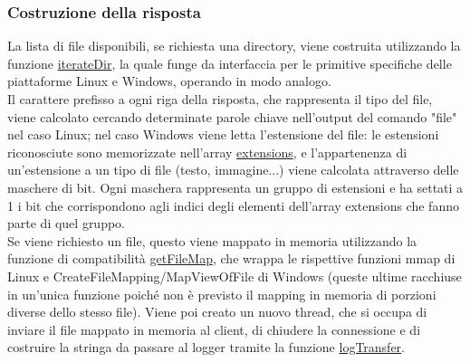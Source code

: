 \documentclass{article}
\begin{document}
\subsubsection{Costruzione della risposta}
La lista di file disponibili, se richiesta una directory, viene costruita utilizzando la funzione \href{html/platform_8h.html#a0cec7649e32d72daadab4beb95e6ef96}
{iterateDir}, la quale funge da interfaccia per le primitive specifiche delle piattaforme Linux e Windows,
operando in modo analogo.\\
Il carattere prefisso a ogni riga della risposta, che rappresenta il tipo del file, viene calcolato
cercando determinate parole chiave nell'output del comando "file" nel caso Linux;
nel caso Windows viene letta l'estensione del file: le estensioni riconosciute sono memorizzate nell'array \href{}{extensions},
e l'appartenenza di un'estensione a un tipo di file (testo, immagine...) viene calcolata attraverso delle maschere di bit.
Ogni maschera rappresenta un gruppo di estensioni e ha settati a 1 i bit che corrispondono agli indici degli elementi
dell'array extensions che fanno parte di quel gruppo.\\
Se viene richiesto un file, questo viene mappato in memoria utilizzando la funzione di 
compatibilità \href{html/platform_8c.html#a135c09a3fee8c20311691644b6f7f289}{getFileMap}, che wrappa le rispettive funzioni
mmap di Linux e CreateFileMapping/MapViewOfFile di Windows (queste ultime racchiuse in un'unica funzione
poiché non è previsto il mapping in memoria di porzioni diverse dello stesso file). Viene poi creato un nuovo thread, che si occupa di
inviare il file mappato in memoria al client, di chiudere la connessione e di costruire la stringa da passare al
logger tramite la funzione \href{html/logger_8h.html#a75e89b9eefc53e23a458412ea544ab7e}{logTransfer}.
\end{document}
